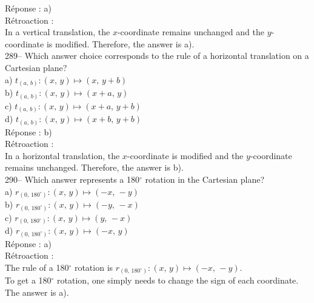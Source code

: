 \documentclass[letterpaper, 12pt]{article}
\begin{document}
R\'eponse : a)\\

R\'etroaction :\\
In a vertical translation, the $x$-coordinate remains unchanged and
the $y$-coordinate is modified.
Therefore, the answer is a).\\

289-- Which answer choice corresponds to the rule of a horizontal
translation on a Cartesian plane?\\

a) $t_{\left( a,\,b\right) } :\left(x,\,y\right)\longmapsto
\left(x,\,y+b\right) $\\
b) $t_{\left( a,\,b\right) } :\left(x,\,y\right)\longmapsto
\left(x+a,\,y\right) $\\
c) $t_{\left( a,\,b\right) } :\left(x,\,y\right)\longmapsto
\left(x+a,\,y+b\right) $\\
d) $t_{\left( a,\,b\right) } :\left(x,\,y\right)\longmapsto
\left(x+b,\,y+b\right) $\\

R\'eponse : b)\\

R\'etroaction :\\
In a horizontal translation, the $x$-coordinate is modified and the
$y$-coordinate remains unchanged. Therefore, the answer is b).\\

290-- Which answer represents a 180$^{\circ}$ rotation in the Cartesian plane?\\

a) $r_{\left( 0,\,180^{\circ}\right) } :\left( x,\,y\right)
\longmapsto
\left(-x,\,-y\right) $ \\
b) $r_{\left( 0,\,180^{\circ}\right) } :\left( x,\,y\right)
\longmapsto
\left(-y,\,-x\right) $ \\
c) $r_{\left( 0,\,180^{\circ}\right) } :\left( x,\,y\right)
\longmapsto
\left(y,\,-x\right) $\\
d) $r_{\left( 0,\,180^{\circ}\right) } :\left( x,\,y\right)
\longmapsto
\left(-x,\,y\right) $\\

R\'eponse : a)\\

R\'etroaction : \\
The rule of a 180$^{\circ}$ rotation is $r_{\left(
0,\,180^{\circ}\right) } :\left( x,\,y\right) \longmapsto
\left(-x,\,-y\right) $.\\
To get a 180$^{\circ}$ rotation, one simply needs to change the sign
of each coordinate. The answer is a).\\
\end{document}
